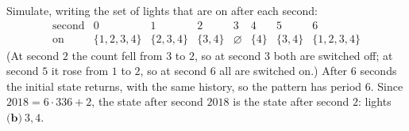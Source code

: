 Simulate, writing the set of lights that are on after each second:
\[
\begin{array}{c|ccccccc}
\text{second}&0&1&2&3&4&5&6\\\hline
\text{on}&\{1,2,3,4\}&\{2,3,4\}&\{3,4\}&\varnothing&\{4\}&\{3,4\}&\{1,2,3,4\}
\end{array}
\]
(At second $2$ the count fell from $3$ to $2$, so at second $3$ both are switched off; at second $5$ it rose from $1$ to $2$, so at second $6$ all are switched on.) After $6$ seconds the initial state returns, with the same history, so the pattern has period $6$. Since $2018=6\cdot336+2$, the state after second $2018$ is the state after second $2$: lights $\boxed{\textbf{(b)}\ 3,4}$.
